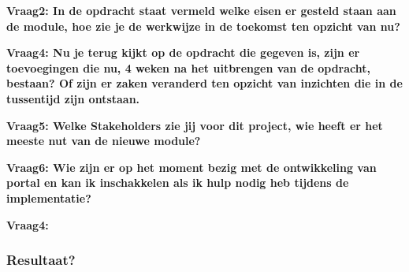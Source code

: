 \textbf{Vraag2: In de opdracht staat vermeld welke eisen er gesteld staan aan de module, hoe zie je de werkwijze in de toekomst ten opzicht van nu?}

\lipsum[03]
\bigskip

\textbf{Vraag4: Nu je terug kijkt op de opdracht die gegeven is, zijn er toevoegingen die nu, 4 weken na het uitbrengen van de opdracht, bestaan? Of zijn er zaken veranderd ten opzicht van inzichten die in de tussentijd zijn ontstaan.}

\lipsum[05]
\bigskip

\textbf{Vraag5: Welke Stakeholders zie jij voor dit project, wie heeft er het meeste nut van de nieuwe module? }

\lipsum[06]
\bigskip

\textbf{Vraag6: Wie zijn er op het moment bezig met de ontwikkeling van portal en kan ik inschakkelen als ik hulp nodig heb tijdens de implementatie?}

\lipsum[09]
\bigskip

\textbf{Vraag4: }

\lipsum[07]

\subsubsection{Resultaat?}
